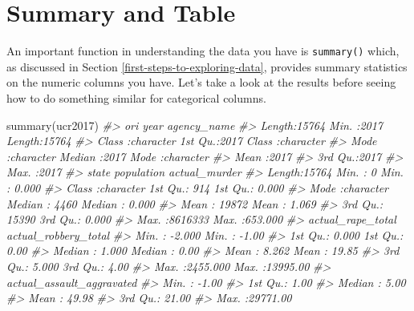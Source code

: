 \documentclass[
]{krantz}
\makeatletter
\newenvironment{Shaded}{\begin{snugshade}}{\end{snugshade}}
\newcommand{\CommentTok}[1]{\textcolor[rgb]{0.37,0.37,0.37}{\textit{#1}}}
\newcommand{\FunctionTok}[1]{\textcolor[rgb]{0,0,0}{#1}}
\newcommand{\NormalTok}[1]{#1}
\newenvironment{kframe}{%
\medskip{}
\setlength{\fboxsep}{.8em}
 \def\at@end@of@kframe{}%
 \ifinner\ifhmode%
  \def\at@end@of@kframe{\end{minipage}}%
  \begin{minipage}{\columnwidth}%
 \fi\fi%
 \def\FrameCommand##1{\hskip\@totalleftmargin \hskip-\fboxsep
 \colorbox{shadecolor}{##1}\hskip-\fboxsep
     \hskip-\linewidth \hskip-\@totalleftmargin \hskip\columnwidth}%
 \MakeFramed {\advance\hsize-\width
   \@totalleftmargin\z@ \linewidth\hsize
   \@setminipage}}%
 {\par\unskip\endMakeFramed%
 \at@end@of@kframe}
\renewenvironment{Shaded}{\begin{kframe}}{\end{kframe}}
\makeatother
\begin{document}
\hypertarget{summary-and-table}{%
\section{Summary and Table}\label{summary-and-table}}

An important function in understanding the data you have is \texttt{summary()} which, as discussed in Section \ref{first-steps-to-exploring-data}, provides summary statistics on the numeric columns you have. Let's take a look at the results before seeing how to do something similar for categorical columns.

\begin{Shaded}
\begin{Highlighting}[]
\FunctionTok{summary}\NormalTok{(ucr2017)}
\CommentTok{\#\textgreater{}      ori                 year      agency\_name       }
\CommentTok{\#\textgreater{}  Length:15764       Min.   :2017   Length:15764      }
\CommentTok{\#\textgreater{}  Class :character   1st Qu.:2017   Class :character  }
\CommentTok{\#\textgreater{}  Mode  :character   Median :2017   Mode  :character  }
\CommentTok{\#\textgreater{}                     Mean   :2017                     }
\CommentTok{\#\textgreater{}                     3rd Qu.:2017                     }
\CommentTok{\#\textgreater{}                     Max.   :2017                     }
\CommentTok{\#\textgreater{}     state             population      actual\_murder    }
\CommentTok{\#\textgreater{}  Length:15764       Min.   :      0   Min.   :  0.000  }
\CommentTok{\#\textgreater{}  Class :character   1st Qu.:    914   1st Qu.:  0.000  }
\CommentTok{\#\textgreater{}  Mode  :character   Median :   4460   Median :  0.000  }
\CommentTok{\#\textgreater{}                     Mean   :  19872   Mean   :  1.069  }
\CommentTok{\#\textgreater{}                     3rd Qu.:  15390   3rd Qu.:  0.000  }
\CommentTok{\#\textgreater{}                     Max.   :8616333   Max.   :653.000  }
\CommentTok{\#\textgreater{}  actual\_rape\_total  actual\_robbery\_total}
\CommentTok{\#\textgreater{}  Min.   :  {-}2.000   Min.   :   {-}1.00    }
\CommentTok{\#\textgreater{}  1st Qu.:   0.000   1st Qu.:    0.00    }
\CommentTok{\#\textgreater{}  Median :   1.000   Median :    0.00    }
\CommentTok{\#\textgreater{}  Mean   :   8.262   Mean   :   19.85    }
\CommentTok{\#\textgreater{}  3rd Qu.:   5.000   3rd Qu.:    4.00    }
\CommentTok{\#\textgreater{}  Max.   :2455.000   Max.   :13995.00    }
\CommentTok{\#\textgreater{}  actual\_assault\_aggravated}
\CommentTok{\#\textgreater{}  Min.   :   {-}1.00         }
\CommentTok{\#\textgreater{}  1st Qu.:    1.00         }
\CommentTok{\#\textgreater{}  Median :    5.00         }
\CommentTok{\#\textgreater{}  Mean   :   49.98         }
\CommentTok{\#\textgreater{}  3rd Qu.:   21.00         }
\CommentTok{\#\textgreater{}  Max.   :29771.00}
\end{Highlighting}
\end{Shaded}
\end{document}
